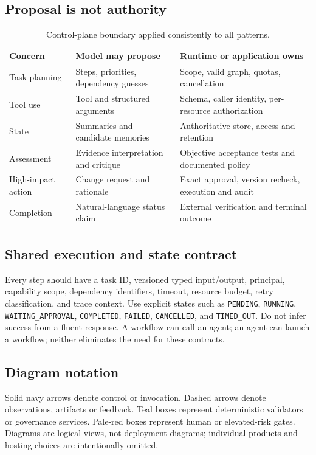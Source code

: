 \subsection{Proposal is not authority}
\begin{table}[htbp]\small\centering
\begin{tabularx}{\linewidth}{@{}p{29mm}Y Y@{}}\toprule
\textbf{Concern} & \textbf{Model may propose} & \textbf{Runtime or application owns}\\\midrule
Task planning & Steps, priorities, dependency guesses & Scope, valid graph, quotas, cancellation\\
Tool use & Tool and structured arguments & Schema, caller identity, per-resource authorization\\
State & Summaries and candidate memories & Authoritative store, access and retention\\
Assessment & Evidence interpretation and critique & Objective acceptance tests and documented policy\\
High-impact action & Change request and rationale & Exact approval, version recheck, execution and audit\\
Completion & Natural-language status claim & External verification and terminal outcome\\\bottomrule
\end{tabularx}
\caption{Control-plane boundary applied consistently to all patterns.}
\end{table}

\subsection{Shared execution and state contract}
Every step should have a task ID, versioned typed input/output, principal, capability scope, dependency identifiers, timeout, resource budget, retry classification, and trace context. Use explicit states such as \texttt{PENDING}, \texttt{RUNNING}, \texttt{WAITING\_APPROVAL}, \texttt{COMPLETED}, \texttt{FAILED}, \texttt{CANCELLED}, and \texttt{TIMED\_OUT}. Do not infer success from a fluent response. A workflow can call an agent; an agent can launch a workflow; neither eliminates the need for these contracts.

\subsection{Diagram notation}
Solid navy arrows denote control or invocation. Dashed arrows denote observations, artifacts or feedback. Teal boxes represent deterministic validators or governance services. Pale-red boxes represent human or elevated-risk gates. Diagrams are logical views, not deployment diagrams; individual products and hosting choices are intentionally omitted.

